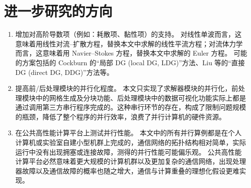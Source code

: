 \section*{进一步研究的方向}
\begin{enumerate}[wide]
\item 增加对高阶导数项（例如：耗散项、黏性项）的支持。
对线性单波而言，这意味着用线性对流–扩散方程，替换本文中求解的线性平流方程；对流体力学而言，这意味着用
Navier–Stokes 方程，替换本文中求解的 Euler 方程。 
可能的方案包括的 Cockburn 的“局部 DG (local DG, LDG)”方法、Liu 等的“直接 DG (direct DG, DDG)”方法等。
\item 提高前/后处理模块的并行化程度。
本文只实现了求解器模块的并行化，前处理模块中的网格生成及分块功能、后处理模块中的数据可视化功能实际上都是通过调用第三方串行程序完成的。这种串行环节的存在，构成了限制问题规模的瓶颈，降低了整个程序的并行效率，浪费了并行计算机的硬件资源。
\item 在公共高性能计算平台上测试并行性能。
本文中的所有并行算例都是在个人计算机或实验室自建小型机群上完成的，通信网络的拓扑结构相对简单，实际运行中没有出现拥塞或连接故障，测得的并行性能可能偏乐观。
公共高性能计算平台必然意味着更大规模的计算机群以及更加复杂的通信网络，出现处理器故障以及通信故障的概率也随之增大，通信与计算重叠的理想化假设更难实现。
\end{enumerate}
